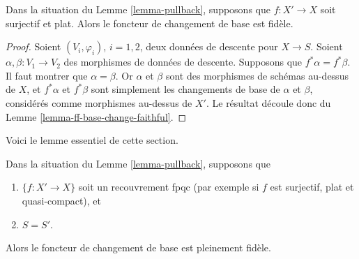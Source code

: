 \begin{lemma}
\label{lemma-faithful}
Dans la situation du Lemme \ref{lemma-pullback}, supposons que
$f : X' \to X$ soit surjectif et plat. Alors le foncteur de changement de
base est fidèle.
\end{lemma}

\begin{proof}
Soient $(V_i, \varphi_i)$, $i = 1, 2$, deux données de descente pour
$X \to S$. Soient $\alpha, \beta : V_1 \to V_2$ des morphismes de données
de descente. Supposons que $f^*\alpha = f^*\beta$. Il faut montrer que
$\alpha = \beta$. Or $\alpha$ et $\beta$ sont des morphismes de schémas
au-dessus de $X$, et $f^*\alpha$ et $f^*\beta$ sont simplement les
changements de base de $\alpha$ et $\beta$, considérés comme morphismes
au-dessus de $X'$.
Le résultat découle donc du
Lemme \ref{lemma-ff-base-change-faithful}.
\end{proof}

\noindent
Voici le lemme essentiel de cette section.

\begin{lemma}
\label{lemma-fully-faithful}
Dans la situation du Lemme \ref{lemma-pullback}, supposons que
\begin{enumerate}
\item $\{f : X' \to X\}$ soit un recouvrement fpqc (par exemple si $f$ est
surjectif, plat et quasi-compact), et
\item $S = S'$.
\end{enumerate}
Alors le foncteur de changement de base est pleinement fidèle.
\end{lemma}

